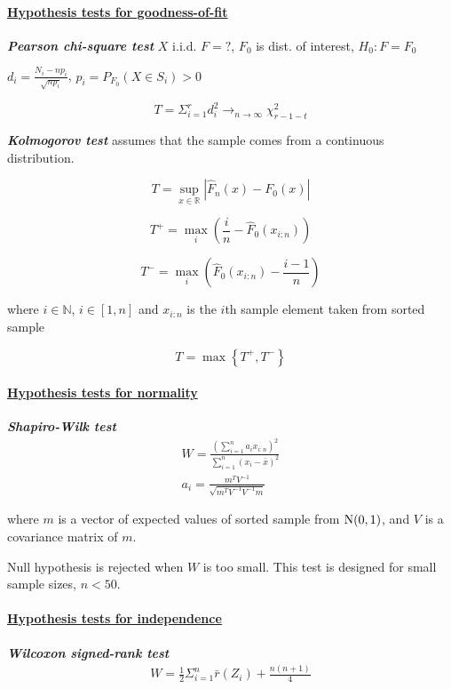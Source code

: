 \paragraph{\underline{Hypothesis tests for goodness-of-fit}} \hspace{0pt}

\vspace{10pt} \noindent \textbf{\em Pearson chi-square test}
$X$ i.i.d. $F=?$, $F_0$ is dist. of interest, $H_0: F=F_0$

$d_i= \frac{N_i - np_i}{\sqrt{np_i}}$,
$p_i = P_{F_0}(X \in S_i) > 0$

\[ T = \Sigma_{i=1}^r d_i^2 \rightarrow_{n \rightarrow \infty} \chi^2_{r-1-t} \]

\vspace{10pt} \noindent \textbf{\em Kolmogorov test} assumes that the sample comes from a continuous distribution.

\[ T = \sup_{x \in \mathbb{R}}{ \left| \hat{F}_n(x) - F_0(x) \right| } \]

\[ T^+ = \max_{i}{ \left( \frac{i}{n} - \hat{F}_0(x_{i:n}) \right) } \]

\[ T^- = \max_{i}{ \left( \hat{F}_0(x_{i:n}) - \frac{i-1}{n} \right) } \]

where $i \in \mathbb{N}$, $i \in [1,n]$ and $x_{i:n}$ is the $i$th sample element taken from sorted sample

\[ T = \max{ \left\{ T^+, T^- \right\} } \]

\paragraph{\underline{Hypothesis tests for normality}} \hspace{0pt}

\vspace{10pt} \noindent \textbf{\em Shapiro-Wilk test}
\begin{gather*}
W = \frac{ \left( \sum_{i=1}^{n} a_i x_{i:n} \right)^2 }{ \sum_{i=1}^{n} \left( x_i - \bar{x} \right)^2 } \\
a_i = \frac{m^T V^{-1}}{ \sqrt{ m^T V^{-1} V^{-1} m } }
\end{gather*}

where $m$ is a vector of expected values of sorted sample from $\textrm{N}(0,1)$, and $V$ is a covariance matrix of $m$.

Null hypothesis is rejected when $W$ is too small. This test is designed for small sample sizes, $n < 50$. 

\paragraph{\underline{Hypothesis tests for independence}} \hspace{0pt}

\vspace{10pt} \noindent \textbf{\em Wilcoxon signed-rank test}
\begin{gather*}
W = \frac{1}{2}\Sigma_{i=1}^n \bar{r}(Z_i)+\frac{n(n + 1)}{4}
\end{gather*}
